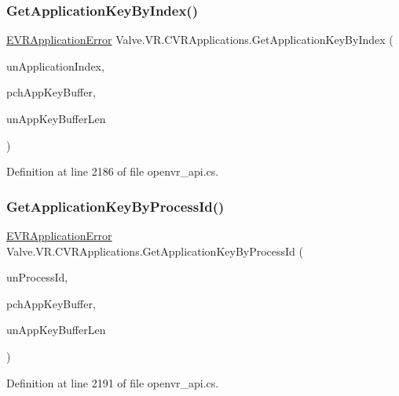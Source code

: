 \subsubsection{\texorpdfstring{GetApplicationKeyByIndex()}{GetApplicationKeyByIndex()}}
{\footnotesize\ttfamily \mbox{\hyperlink{namespace_valve_1_1_v_r_a3488adab8a219b579fcee50f4e63a8b6}{E\+V\+R\+Application\+Error}} Valve.\+V\+R.\+C\+V\+R\+Applications.\+Get\+Application\+Key\+By\+Index (\begin{DoxyParamCaption}\item[{uint}]{un\+Application\+Index,  }\item[{System.\+Text.\+String\+Builder}]{pch\+App\+Key\+Buffer,  }\item[{uint}]{un\+App\+Key\+Buffer\+Len }\end{DoxyParamCaption})}



Definition at line 2186 of file openvr\+\_\+api.\+cs.

\mbox{\label{class_valve_1_1_v_r_1_1_c_v_r_applications_a426c0a54264e05dc34a9e82d8922e451}} 
\subsubsection{\texorpdfstring{GetApplicationKeyByProcessId()}{GetApplicationKeyByProcessId()}}
{\footnotesize\ttfamily \mbox{\hyperlink{namespace_valve_1_1_v_r_a3488adab8a219b579fcee50f4e63a8b6}{E\+V\+R\+Application\+Error}} Valve.\+V\+R.\+C\+V\+R\+Applications.\+Get\+Application\+Key\+By\+Process\+Id (\begin{DoxyParamCaption}\item[{uint}]{un\+Process\+Id,  }\item[{System.\+Text.\+String\+Builder}]{pch\+App\+Key\+Buffer,  }\item[{uint}]{un\+App\+Key\+Buffer\+Len }\end{DoxyParamCaption})}



Definition at line 2191 of file openvr\+\_\+api.\+cs.

\mbox{\label{class_valve_1_1_v_r_1_1_c_v_r_applications_a611d0f32e55ad2f8efda056a608ac678}} 
